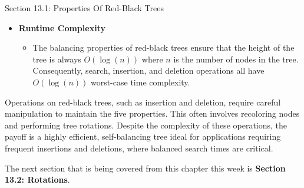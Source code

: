 \begin{notes}{Section 13.1: Properties Of Red-Black Trees}
\begin{itemize}
        \item \textbf{Runtime Complexity}
        \begin{itemize}
            \item The balancing properties of red-black trees ensure that the height of the tree is always $O(\log{(n)})$ where $n$ is the number of nodes in the tree. Consequently, search, insertion, 
            and deletion operations all have $O(\log{(n)})$ worst-case time complexity.
        \end{itemize}
    \end{itemize}
    
    \begin{highlight}
        Operations on red-black trees, such as insertion and deletion, require careful manipulation to maintain the five properties. This often involves recoloring nodes and performing tree rotations. 
        Despite the complexity of these operations, the payoff is a highly efficient, self-balancing tree ideal for applications requiring frequent insertions and deletions, where balanced search times 
        are critical.
    \end{highlight}      
\end{notes}

The next section that is being covered from this chapter this week is \textbf{Section 13.2: Rotations}.

